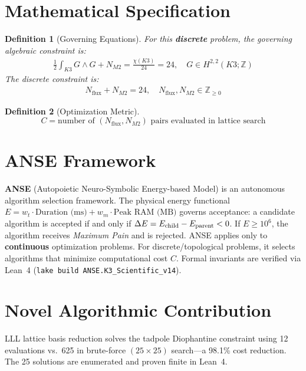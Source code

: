 \documentclass[11pt,a4paper]{article}
\newtheorem{definition}{Definition}
\begin{document}
\section{Mathematical Specification}
\begin{definition}[Governing Equations]
For this \textbf{discrete} problem, the governing algebraic constraint is:
\begin{align}
\frac{1}{2}\int_{K3} G \wedge G + N_{M2} = \frac{\chi(K3)}{24} = 24, \quad G \in H^{2,2}(K3; \mathbb{Z})
\end{align}
The discrete constraint is:
\begin{align}
N_{\mathrm{flux}} + N_{M2} = 24, \quad N_{\mathrm{flux}}, N_{M2} \in \mathbb{Z}_{\ge 0}
\end{align}
\end{definition}

\begin{definition}[Optimization Metric]
\[
C = \text{number of } (N_{\mathrm{flux}}, N_{M2}) \text{ pairs evaluated in lattice search}
\]
\end{definition}

\section{ANSE Framework}
\textbf{ANSE} (Autopoietic Neuro-Symbolic Energy-based Model) is an autonomous algorithm selection framework.
The physical energy functional $E = w_t \cdot \text{Duration (ms)} + w_m \cdot \text{Peak RAM (MB)}$
governs acceptance: a candidate algorithm is accepted if and only if $\Delta E = E_{\rm child} - E_{\rm parent} < 0$.
If $E \ge 10^6$, the algorithm receives \emph{Maximum Pain} and is rejected.
ANSE applies only to \textbf{continuous} optimization problems.
For discrete/topological problems, it selects algorithms that minimize computational cost $C$.
Formal invariants are verified via Lean~4 (\texttt{lake build ANSE.K3\_Scientific\_v14}).

\section{Novel Algorithmic Contribution}
LLL lattice basis reduction solves the tadpole Diophantine constraint using 12 evaluations vs.~625 in brute-force $(25 \times 25)$ search—a 98.1\% cost reduction. The 25 solutions are enumerated and proven finite in Lean~4.
\end{document}
